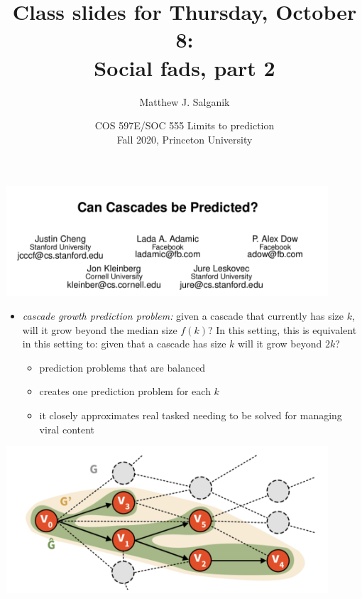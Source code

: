 \documentclass[aspectratio=169]{beamer}
\title[]{Class slides for Thursday, October 8:\\Social fads, part 2}
\author[]{Matthew J. Salganik}
\institute[]{}
\date[]{COS 597E/SOC 555 Limits to prediction\\Fall 2020, Princeton University}
\begin{document}
\frame{\titlepage}
\begin{frame}

\begin{center}
  \includegraphics[width = 0.9\textwidth]{figures/cheng_can_2014_title}
\end{center}

\end{frame}
\begin{frame}

\begin{itemize}
\item \emph{cascade growth prediction problem:} given a cascade that currently has size $k$, will it grow beyond the median size $f(k)$? \pause In this setting, this is equivalent in this setting to: given that a cascade has size $k$ will it grow beyond $2k$? 
\pause
\begin{itemize}
\item prediction problems that are balanced
\item creates one prediction problem for each $k$
\item it closely approximates real tasked needing to be solved for managing viral content
\end{itemize}
\end{itemize}

\end{frame}
\begin{frame}

\begin{center}
  \includegraphics[width = 0.9\textwidth]{figures/cheng_can_2014_fig1}
\end{center}

\end{frame}
\end{document}
